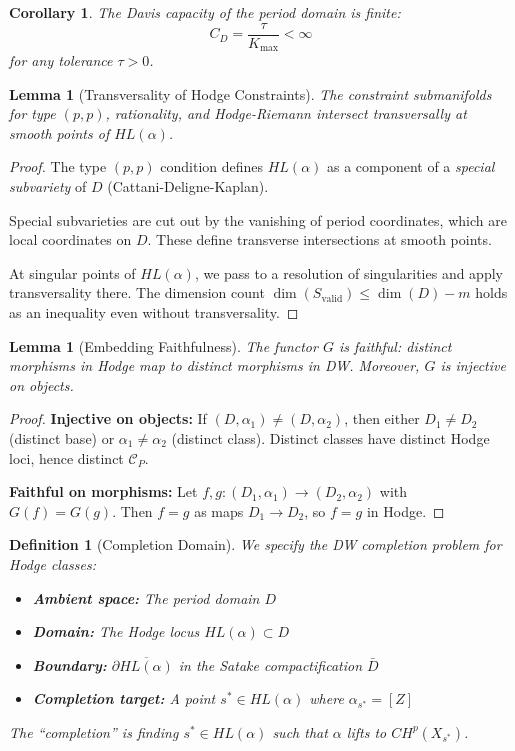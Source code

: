 \documentclass[12pt]{article}
\newtheorem{lemma}[theorem]{Lemma}
\newtheorem{corollary}[theorem]{Corollary}
\newtheorem{definition}[theorem]{Definition}
\begin{document}
\begin{corollary}
The Davis capacity of the period domain is finite:
\[
C_D = \frac{\tau}{K_{\max}} < \infty
\]
for any tolerance $\tau > 0$.
\end{corollary}

\begin{lemma}[Transversality of Hodge Constraints]
The constraint submanifolds for type $(p,p)$, rationality, and Hodge-Riemann 
intersect transversally at smooth points of $HL(\alpha)$.
\end{lemma}

\begin{proof}
The type $(p,p)$ condition defines $HL(\alpha)$ as a component of a 
\emph{special subvariety} of $D$ (Cattani-Deligne-Kaplan).

Special subvarieties are cut out by the vanishing of period coordinates, 
which are local coordinates on $D$. These define transverse intersections 
at smooth points.

At singular points of $HL(\alpha)$, we pass to a resolution of singularities 
and apply transversality there. The dimension count 
$\dim(S_{\text{valid}}) \leq \dim(D) - m$ holds as an inequality even 
without transversality.
\end{proof}

\begin{lemma}[Embedding Faithfulness]
The functor $G$ is faithful: distinct morphisms in Hodge map to distinct morphisms in DW.
Moreover, $G$ is injective on objects.
\end{lemma}

\begin{proof}
\textbf{Injective on objects:} If $(D, \alpha_1) \neq (D, \alpha_2)$, then either
$D_1 \neq D_2$ (distinct base) or $\alpha_1 \neq \alpha_2$ (distinct class).
Distinct classes have distinct Hodge loci, hence distinct $\mathcal{C}_P$.

\textbf{Faithful on morphisms:} Let $f, g: (D_1, \alpha_1) \to (D_2, \alpha_2)$ with 
$G(f) = G(g)$. Then $f = g$ as maps $D_1 \to D_2$, so $f = g$ in Hodge.
\end{proof}

\begin{definition}[Completion Domain]
We specify the DW completion problem for Hodge classes:
\begin{itemize}
\item \textbf{Ambient space:} The period domain $D$
\item \textbf{Domain:} The Hodge locus $HL(\alpha) \subset D$
\item \textbf{Boundary:} $\partial \overline{HL(\alpha)}$ in the Satake compactification $\bar{D}$
\item \textbf{Completion target:} A point $s^* \in HL(\alpha)$ where $\alpha_{s^*} = [Z]$
\end{itemize}
The ``completion'' is finding $s^* \in HL(\alpha)$ such that $\alpha$ lifts to $CH^p(X_{s^*})$.
\end{definition}
\end{document}
